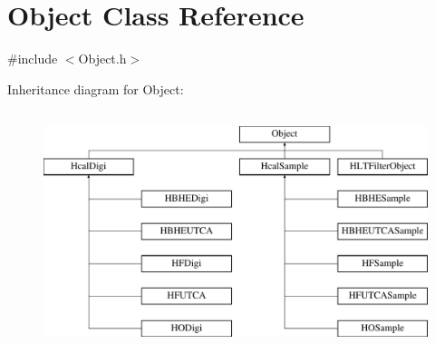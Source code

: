 \hypertarget{class_object}{}\section{Object Class Reference}
\label{class_object}


{\ttfamily \#include $<$Object.\+h$>$}

Inheritance diagram for Object\+:\begin{figure}[H]
\begin{center}
\leavevmode
\includegraphics[height=7.000000cm]{class_object}
\end{center}
\end{figure}
